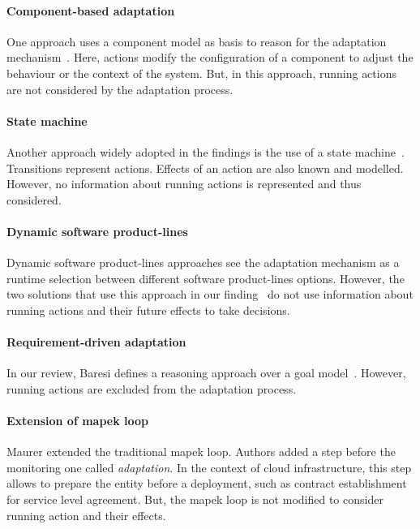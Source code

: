 \paragraph{Component-based adaptation}
One approach uses a component model as basis to reason for the adaptation mechanism~\cite{DBLP:conf/soco/DavidL06}.
Here, \glspl{action} modify the configuration of a component to adjust the behaviour or the context of the system.
But, in this approach, running \glspl{action} are not considered by the adaptation process.

\paragraph{State machine}
Another approach widely adopted in the findings is the use of a state machine~\cite{DBLP:conf/sigsoft/MorenoCGS15, DBLP:conf/kbse/FilieriGLM11,DBLP:conf/wetice/DjoudiBZ14, DBLP:conf/aosd/ZhangGC09, DBLP:conf/icse/GhezziPST13, DBLP:conf/kbse/TajalliGEM10}.
Transitions represent \glspl{action}.
Effects of an action are also known and modelled.
However, no information about running \glspl{action} is represented and thus considered.


\paragraph{Dynamic software product-lines}
Dynamic software product-lines approaches see the adaptation mechanism as a runtime selection between different software product-lines options.
However, the two solutions that use this approach in our finding~\cite{DBLP:conf/dagstuhl/GhezziS10, DBLP:series/lncs/CordyCHLS13} do not use information about running \glspl{action} and their future effects to take decisions.  

\paragraph{Requirement-driven adaptation}
In our review, Baresi \etal defines a reasoning approach over a goal model~\cite{DBLP:conf/re/BaresiPS10}.
However, running \glspl{action} are excluded from the adaptation process.

\paragraph{Extension of \gls{mapek} loop}
Maurer \etal \cite{DBLP:conf/iscc/MaurerBEB11} extended the traditional \gls{mapek} loop.
Authors added a step before the monitoring one called \textit{adaptation}.
In the context of cloud infrastructure, this step allows to prepare the entity before a deployment, such as contract establishment for service level agreement.
But, the \gls{mapek} loop is not modified to consider running \gls{action} and their effects.

